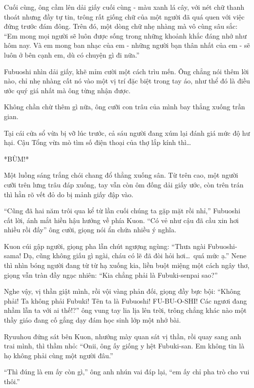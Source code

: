 \documentclass[../main.tex]{subfiles}
\begin{document}
Cuối cùng, ông cầm lên dải giấy cuối cùng - màu xanh lá cây, với nét chữ thanh thoát nhưng đầy tự tin, trông rất giống chữ của một người đã quá quen với việc đứng trước đám đông. Trên đó, một dòng chữ nhẹ nhàng mà vô cùng sâu sắc: ``Em mong mọi người sẽ luôn được sống trong những khoảnh khắc đáng nhớ như hôm nay. Và em mong ban nhạc của em - những người bạn thân nhất của em - sẽ luôn ở bên cạnh em, dù có chuyện gì đi nữa.''

Fubuoshi nhìn dải giấy, khẽ mỉm cười một cách trìu mến. Ông chẳng nói thêm lời nào, chỉ nhẹ nhàng cất nó vào một vị trí đặc biệt trong tay áo, như thể đó là điều ước quý giá nhất mà ông từng nhận được.

Không chần chừ thêm gì nữa, ông cưỡi con trâu của mình bay thẳng xuống trần gian.

\ct

Tại cái cửa sổ vừa bị vỡ lúc trước, cả sáu người đang xúm lại đánh giá mức độ hư hại. Cậu Tổng vừa mò tìm số điện thoại của thợ lắp kính thì\dots

*BÙM!*

Một luồng sáng trắng chói chang đổ thẳng xuống sân. Từ trên cao, một người cưỡi trên lưng trâu đáp xuống, tay vẫn còn ôm đống dải giấy ước, còn trên trán thì hằn rõ vết đỏ do bị mảnh giấy đập vào.


``Cũng đã hai năm trôi qua kể từ lần cuối chúng ta gặp mặt rồi nhỉ,'' Fubuoshi cất lời, ánh mắt hiền hậu hướng về phía Kuon. ``Có vẻ như cậu đã cầu xin hơi nhiều rồi đấy'' ông cười, giọng nói ẩn chứa nhiều ý nghĩa.

Kuon cúi gập người, giọng pha lẫn chút ngượng ngùng: ``Thưa ngài Fubuoshi-sama! Dạ, cũng không giấu gì ngài, cháu có lẽ đã đòi hỏi hơi\dots\ quá mức ạ.'' Nene thì nhìn bóng người đang từ từ hạ xuống kia, liền buột miệng một cách ngây thơ, giọng vẫn tràn đầy ngạc nhiên: ``Kia chẳng phải là Fubuki-senpai sao?''

Nghe vậy, vị thần giật mình, rồi vội vàng phản đối, giọng đầy bực bội: ``Không phải! Ta không phải Fubuki! Tên ta là Fubuoshi! FU-BU-O-SHI! Các ngươi đang nhầm lẫn ta với ai thế!?'' ông vung tay lia lịa lên trời, trông chẳng khác nào một thầy giáo đang cố gắng dạy đám học sinh lớp một nhớ bài.

Ryuuhou đứng sát bên Kuon, nhướng mày quan sát vị thần, rồi quay sang anh trai mình, thì thầm nhỏ: ``Onii, ông ấy giống y hệt Fubuki-san. Em không tin là họ không phải cùng một người đâu.''

``Thì đúng là em ấy còn gì,'' ông anh nhún vai đáp lại, ``em ấy chỉ pha trò cho vui thôi.''
\end{document}
